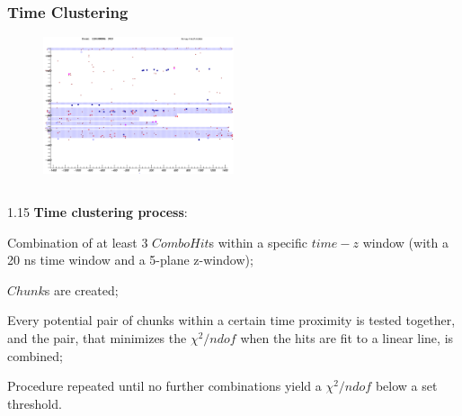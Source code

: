\documentclass{beamer}
\begin{document}
\begin{frame}
    \frametitle{Time Clustering}
    \vspace{-3mm}
    \begin{figure}[!h]
        \centering
        \includegraphics[width =0.5\textwidth]{figures/png/Screenshot_20240809_162925.png}
       \end{figure}
       \vspace{-2mm}
    \begin{columns}
        \begin{column}{1.15\framewidth}
            \setlength{\leftmargini}{1.1em}
            {\small \textbf{Time clustering process}:}
            \begin{enumerate}
               {\small \item Combination of at least 3 $ComboHit$s within a specific $time-z$ 
               window (with a 
               20 ns time window and a 5-plane z-window);
               \item $Chunk$s are created;
               \item  Every potential pair of chunks 
               within a certain time 
               proximity is tested together, 
               and the pair, that minimizes 
               the $\chi^2/ndof$ when the hits 
               are fit to a linear line, is combined;
               \item Procedure repeated until no further combinations 
               yield a $\chi^2/ndof$ below a set 
               threshold.
                }
            \end{enumerate}
        \end{column}
        \end{columns}

\end{frame}
\end{document}

